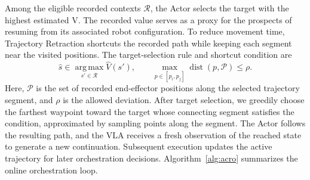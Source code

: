Among the eligible recorded contexts $\mathcal R$, the Actor
selects the target with the highest estimated V. The recorded
value serves as a proxy for the prospects of resuming from its
associated robot configuration. To reduce movement time, Trajectory
Retraction shortcuts the recorded path while keeping each segment
near the visited positions. The target-selection rule and shortcut
condition are
\begin{equation}
\hat s\in\operatorname*{arg\,max}_{s'\in\mathcal R}\widehat V(s'),
\qquad
\max_{p\in[p_i,p_j]}\operatorname{dist}(p,\mathcal P)\le\rho.
\label{eq:value-guided-repositioning}
\end{equation}
Here, $\mathcal P$ is the set of recorded end-effector positions
along the selected trajectory segment, and $\rho$ is the allowed
deviation. After target selection, we greedily choose the farthest
waypoint toward the target whose connecting segment satisfies
the condition, approximated by sampling points along the segment.
The Actor follows the resulting path, and the VLA receives a
fresh observation of the reached state to generate a new
continuation. Subsequent execution updates the active trajectory
for later orchestration decisions. Algorithm~\ref{alg:acro} summarizes the online orchestration loop.

